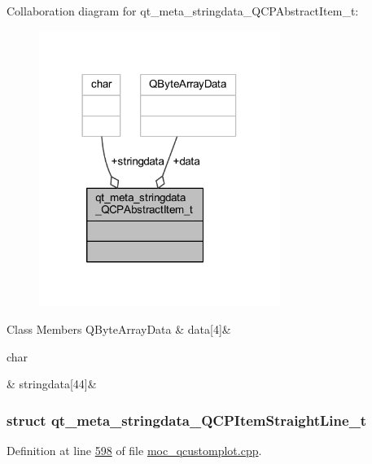 Collaboration diagram for qt\+\_\+meta\+\_\+stringdata\+\_\+\+Q\+C\+P\+Abstract\+Item\+\_\+t\+:
\nopagebreak
\begin{figure}[H]
\begin{center}
\leavevmode
\includegraphics[width=222pt]{d6/dfb/a00172}
\end{center}
\end{figure}
\begin{DoxyFields}{Class Members}
\hypertarget{a00016_ab4317fd8db7c91bab9009e558b7cb145}{Q\+Byte\+Array\+Data}\label{a00016_ab4317fd8db7c91bab9009e558b7cb145}
&
data\mbox{[}4\mbox{]}&
\\
\hline

\hypertarget{a00016_ade6e562aa7d6defc621f68d53679440b}{char}\label{a00016_ade6e562aa7d6defc621f68d53679440b}
&
stringdata\mbox{[}44\mbox{]}&
\\
\hline

\end{DoxyFields}
\label{dd/d6d/a00111}
\hypertarget{a00016_dd/d6d/a00111}{}
\subsubsection{struct qt\+\_\+meta\+\_\+stringdata\+\_\+\+Q\+C\+P\+Item\+Straight\+Line\+\_\+t}


Definition at line \hyperlink{a00016_source_l00598}{598} of file \hyperlink{a00016_source}{moc\+\_\+qcustomplot.\+cpp}.



